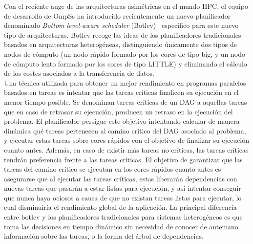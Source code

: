 
Con el reciente auge de las arquitecturas asimétricas en el mundo HPC, el
equipo de desarrollo de OmpSs ha introducido recientemente un nuevo
planificador denominado \emph{Bottom level-aware scheduler}
(Botlev)~\cite{botlev} específico para este nuevo tipo de
arquitecturas. Botlev recoge las ideas de los planificadores tradicionales
basados en arquitecturas heterogéneas, distinguiendo únicamente dos tipos
de nodos de cómputo (un nodo rápido formado por los cores de tipo big, y un
nodo de cómputo lento formado por los cores de tipo LITTLE) y eliminando el
cálculo de los costes asociados a
la transferencia de datos. \\

Una técnica utilizada para obtener un mejor rendimiento en programas
paralelos basados en tareas es intentar que las tareas críticas finalicen
su ejecución en el menor tiempo posible. Se denominan tareas críticas de un
DAG a aquellas tareas que en caso de retrasar su ejecución, producen un
retraso en la ejecución del problema. El planificador \botlev persigue este
objetivo intentando calcular de manera dinámica qué tareas pertenecen al
camino crítico del DAG asociado al problema, y ejecutar estas tareas sobre
cores rápidos con el objetivo de finalizar su ejecución cuanto
antes. Además, en caso de existir más tareas no críticas, las tareas
críticas tendrán preferencia frente a las tareas críticas. El objetivo de
garantizar que las tareas del camino crítico se ejecutan en los cores
rápidos cuanto antes es asegurarse que al ejecutar las tareas críticas,
estas liberarán dependencias con nuevas tareas que pasarán a estar listas
para ejecución, y así intentar conseguir que nunca haya \wts ociosos a
causa de que no existan tareas listas para ejecutar, lo cual disminuiría el
rendimiento global de la aplicación. La principal diferencia entre botlev y
los planificadores tradicionales para sistemas heterogéneos es que \botlev
toma las decisiones en tiempo dinámico sin necesidad de conocer de antemano
información sobre las tareas, o la forma del árbol de dependencias.

